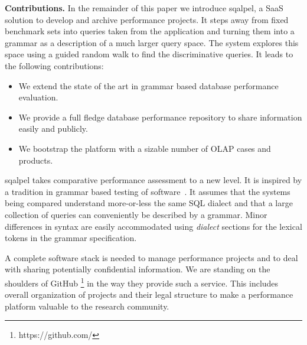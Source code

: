 \documentclass{cidr-2019}
\begin{document}
{\bf Contributions.} In the remainder of this paper we introduce {\sc
  sqalpel}, a SaaS solution to develop and archive performance
projects.
It steps away from fixed benchmark sets into queries taken from the
application and turning them into a grammar as a description of a much
larger query space. The system explores this space using a guided
random walk to find the discriminative queries. It leads to the
following contributions:

\begin{itemize}
	\item We extend the state of the art in grammar based database
          performance evaluation.
	\item We provide a full fledge database performance repository
          to share information easily and publicly.
	\item We bootstrap the platform with a sizable number of OLAP
          cases and products.
\end{itemize}

{\sc sqalpel} takes comparative performance assessment to a new
level. It is inspired by a tradition in grammar based testing of
software~\cite{10.1007/11754008_2}. It assumes that the systems being
compared understand more-or-less the same SQL dialect and that a large
collection of queries can conveniently be described by a
grammar. Minor differences in syntax are easily accommodated using
\emph{dialect} sections for the lexical tokens in the grammar specification.

A complete software stack is needed to manage performance projects and
to deal with sharing potentially confidential information. We are
standing on the shoulders of GitHub%
\footnote{https://github.com/}
in the way they provide such a
service. This includes overall organization of projects and their
legal structure to make a performance platform valuable to the
research community.
\end{document}
